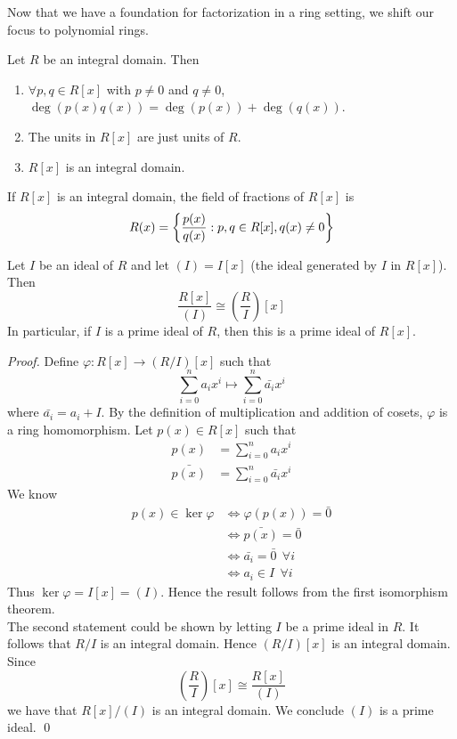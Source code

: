 Now that we have a foundation for factorization in a ring setting, we shift our focus to polynomial rings.

\begin{recall}
Let $R$ be an integral domain. Then
\begin{enumerate}
    \item $\forall p,q \in R[x]$ with $p\neq 0$ and $q \neq 0$, $\deg(p(x)q(x)) = \deg(p(x)) + \deg(q(x))$.
    \item The units in $R[x]$ are just units of $R$.
    \item $R[x]$ is an integral domain.
\end{enumerate}
\end{recall}

If $R[x]$ is an integral domain, the field of fractions of $R[x]$ is
$$R(x) = \left\{\dfrac{p(x)}{q(x)} : p,q \in R[x], q(x) \neq 0\right\}$$

\begin{proposition}
    Let $I$ be an ideal of $R$ and let $(I) = I[x]$ (the ideal generated by $I$ in $R[x]$). Then
    $$\dfrac{R[x]}{(I)} \cong \left(\dfrac{R}{I}\right)[x]$$
    In particular, if $I$ is a prime ideal of $R$, then this is a prime ideal of $R[x]$.
\end{proposition}

\begin{proof}
    Define $\varphi : R[x] \to (R/I)[x]$ such that
    $$\sum_{i=0}^{n}a_ix^i \mapsto \sum_{i=0}^{n}\bar{a_i}x^i$$
    where $\bar{a_i}=a_i + I$. By the definition of multiplication and addition of cosets, $\varphi$ is a ring homomorphism. Let $p(x) \in R[x]$ such that 
    \begin{align*}
        p(x) &= \sum_{i=0}^{n}a_ix^i \\
        \bar{p(x)} &= \sum_{i=0}^{n}\bar{a_i}x^i
    \end{align*}
    We know 
    \begin{align*}
        p(x) \in \ker \varphi &\iff \varphi(p(x)) = \bar{0} \\
        &\iff \bar{p(x)} = \bar{0} \\
        &\iff \bar{a_i} = \bar{0}~~\forall i \\
        &\iff a_i \in I ~~\forall i
    \end{align*}
    Thus $\ker\varphi = I[x] = (I)$. Hence the result follows from the first isomorphism theorem. \\
    The second statement could be shown by letting $I$ be a prime ideal in $R$. It follows that $R/I$ is an integral domain. Hence $(R/I)[x]$ is an integral domain. Since 
    $$\left(\dfrac{R}{I}\right)[x] \cong \dfrac{R[x]}{(I)}$$
    we have that $R[x]/(I)$ is an integral domain. We conclude $(I)$ is a prime ideal.
    \qed
\end{proof}

